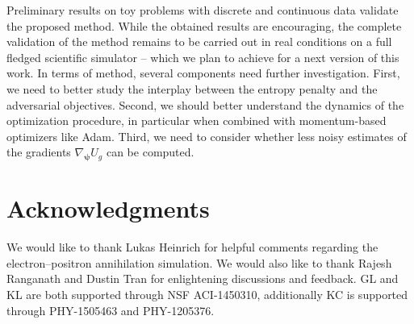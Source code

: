 \documentclass[twocolumn,superscriptaddress,aps]{revtex4-1}
\newcommand{\bfpsi}{{\bm \psi}}
\theoremstyle{plain}
\begin{document}
Preliminary results on toy problems with discrete and continuous data validate
the proposed method. While the obtained results are encouraging, the complete
validation of the method remains to be carried out in real conditions on a full
fledged scientific simulator -- which we plan to achieve for a next version of
this work. In terms of method, several components need further investigation.
First, we need to better study the interplay between the entropy penalty and the
adversarial objectives. Second, we should better understand the dynamics of the
optimization procedure, in particular when combined with momentum-based
optimizers like Adam. Third, we need to consider whether less noisy estimates of
the gradients $\nabla_\bfpsi U_g$ can be computed.



\vspace{0.4cm}
\section*{Acknowledgments}

We would like to thank Lukas Heinrich for helpful comments regarding
the electron--positron annihilation simulation. We would also like to thank
Rajesh Ranganath and Dustin Tran for enlightening discussions and feedback.
GL and KL are both supported through NSF ACI-1450310, additionally KC is
supported through PHY-1505463 and PHY-1205376.



\vspace{2cm}

%


\end{document}
